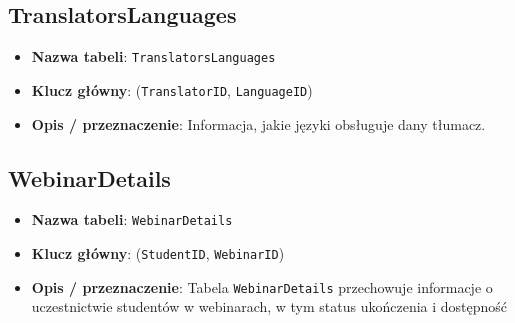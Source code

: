 \documentclass[12pt]{article}
\begin{document}
\subsection{TranslatorsLanguages}
\begin{itemize}
    \item \textbf{Nazwa tabeli}: \texttt{TranslatorsLanguages}
    \item \textbf{Klucz główny}: (\texttt{TranslatorID}, \texttt{LanguageID})
    \item \textbf{Opis / przeznaczenie}:  
          Informacja, jakie języki obsługuje dany tłumacz.
\end{itemize}

\subsection{WebinarDetails}
\begin{itemize}
    \item \textbf{Nazwa tabeli}: \texttt{WebinarDetails}
    \item \textbf{Klucz główny}: (\texttt{StudentID}, \texttt{WebinarID})
    \item \textbf{Opis / przeznaczenie}:  
          Tabela \texttt{WebinarDetails} przechowuje informacje o uczestnictwie studentów w webinarach, w tym status ukończenia i dostępność
\end{itemize}
\end{document}
